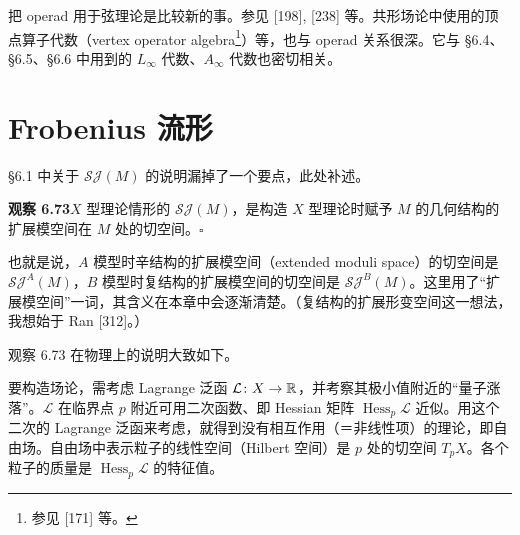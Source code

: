 
把 operad 用于弦理论是比较新的事。参见 [198], [238] 等。共形场论中使用的顶点算子代数（vertex operator algebra\footnote{参见 [171] 等。}）等，也与 operad 关系很深。它与 §6.4、§6.5、§6.6 中用到的 $L_\infty$ 代数、$A_\infty$ 代数也密切相关。

\section{Frobenius 流形}


§6.1 中关于 $\mathcal{SJ}(M)$ 的说明漏掉了一个要点，此处补述。

\textbf{观察 6.73}\quad $X$ 型理论情形的 $\mathcal{SJ}(M)$，是构造 $X$ 型理论时赋予 $M$ 的几何结构的扩展模空间在 $M$ 处的切空间。\hfill$\square$

也就是说，$A$ 模型时辛结构的扩展模空间（extended moduli space）的切空间是 $\mathcal{SJ}^A(M)$，$B$ 模型时复结构的扩展模空间的切空间是 $\mathcal{SJ}^B(M)$。这里用了“扩展模空间”一词，其含义在本章中会逐渐清楚。（复结构的扩展形变空间这一想法，我想始于 Ran [312]。）

观察 6.73 在物理上的说明大致如下。


要构造场论，需考虑 Lagrange 泛函 $\mathcal{L}\colon X\to\mathbb{R}$，并考察其极小值附近的“量子涨落”。$\mathcal{L}$ 在临界点 $p$ 附近可用二次函数、即 Hessian 矩阵 $\operatorname{Hess}_p\mathcal{L}$ 近似。用这个二次的 Lagrange 泛函来考虑，就得到没有相互作用（＝非线性项）的理论，即自由场。自由场中表示粒子的线性空间（Hilbert 空间）是 $p$ 处的切空间 $T_pX$。各个粒子的质量是 $\operatorname{Hess}_p\mathcal{L}$ 的特征值。

